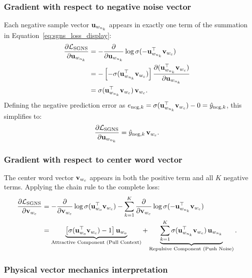 \documentclass[../../main.tex]{subfiles}
\begin{document}
\subsubsection{Gradient with respect to negative noise vector}
Each negative sample vector $\mathbf{u}_{w_{n_k}}$ appears in exactly one term of the summation in Equation~\eqref{eq:sgns_loss_display}:
\begin{align}
\frac{\partial \mathcal{L}_{\text{SGNS}}}{\partial \mathbf{u}_{w_{n_k}}} &= -\frac{\partial}{\partial \mathbf{u}_{w_{n_k}}} \log \sigma(-\mathbf{u}_{w_{n_k}}^\top \mathbf{v}_{w_c}) \notag \\
&= -\left[ -\sigma(\mathbf{u}_{w_{n_k}}^\top \mathbf{v}_{w_c}) \right] \frac{\partial (\mathbf{u}_{w_{n_k}}^\top \mathbf{v}_{w_c})}{\partial \mathbf{u}_{w_{n_k}}} \notag \\
\label{eq:grad_u_neg}
&= \sigma(\mathbf{u}_{w_{n_k}}^\top \mathbf{v}_{w_c}) \, \mathbf{v}_{w_c}.
\end{align}
Defining the negative prediction error as $e_{\text{neg}, k} = \sigma(\mathbf{u}_{w_{n_k}}^\top \mathbf{v}_{w_c}) - 0 = \hat{y}_{\text{neg}, k}$, this simplifies to:
\begin{equation}
\label{eq:grad_u_neg_clean}
\frac{\partial \mathcal{L}_{\text{SGNS}}}{\partial \mathbf{u}_{w_{n_k}}} = \hat{y}_{\text{neg}, k} \, \mathbf{v}_{w_c}.
\end{equation}

\subsubsection{Gradient with respect to center word vector}
The center word vector $\mathbf{v}_{w_c}$ appears in both the positive term and all $K$ negative terms. Applying the chain rule to the complete loss:
\begin{align}
\frac{\partial \mathcal{L}_{\text{SGNS}}}{\partial \mathbf{v}_{w_c}} &= -\frac{\partial}{\partial \mathbf{v}_{w_c}} \log \sigma(\mathbf{u}_{w_o}^\top \mathbf{v}_{w_c}) - \sum_{k=1}^K \frac{\partial}{\partial \mathbf{v}_{w_c}} \log \sigma(-\mathbf{u}_{w_{n_k}}^\top \mathbf{v}_{w_c}) \notag \\
\label{eq:grad_v_center}
&= \underbrace{\left[ \sigma(\mathbf{u}_{w_o}^\top \mathbf{v}_{w_c}) - 1 \right] \mathbf{u}_{w_o}}_{\text{Attractive Component (Pull Context)}} + \underbrace{\sum_{k=1}^K \sigma(\mathbf{u}_{w_{n_k}}^\top \mathbf{v}_{w_c}) \, \mathbf{u}_{w_{n_k}}}_{\text{Repulsive Component (Push Noise)}}.
\end{align}

\subsubsection{Physical vector mechanics interpretation}
\label{subsec:vector_mechanics}
\end{document}
